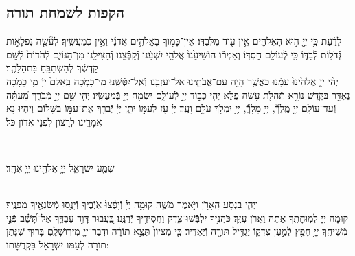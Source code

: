 \documentclass[twoside, openany, parskip=half, 11pt]{book}
\begin{document}
\begin{sometimes}
\chapter[הקפות לשמחת תורה]{ הקפות לשמחת תורה }


 לָדַ֔עַת כִּ֥י יְיָ֖ ה֣וּא הָאֱלֹהִ֑ים אֵ֥ין ע֖וֹד מִלְּֿֿבַדּֽוֹ׃ \hfill \break
אֵין־כָּמ֖וֹךָ בָאֱלֹהִ֥ים אֲדֹנָ֗י וְֿאֵ֣ין כְּֽֿמַעֲשֶֽׂיךָ׃ \hfill \break
לְעֹ֘שֵׂ֤ה נִפְלָא֣וֹת גְּֿדֹל֣וֹת לְֿבַדּ֑וֹ כִּ֖י לְֿעוֹלָ֣ם חַסְדּֽוֹ׃ \hfill \break
וְאִמְר֕וּ הוֹשִׁיעֵ֙נוּ֙ אֱלֹהֵ֣י יִשְׁעֵ֔נוּ וְֿקַבְּֿֿצֵ֥נוּ וְֿהַצִּילֵ֖נוּ מִן־הַגּוֹיִ֑ם לְֿהֹדוֹת֙ לְֿשֵׁ֣ם קָדְֿשֶׁ֔ךָ לְֿהִשְׁתַּבֵּ֖חַ בִּתְהִלָּתֶֽךָ׃\\
יְהִ֨י יְיָ֤ אֱלֹהֵ֙ינוּ֙ עִמָּ֔נוּ כַּאֲשֶׁ֥ר הָיָ֖ה עִם־אֲבֹתֵ֑ינוּ אַל־יַעַזְבֵ֖נוּ וְֿאַֽל־יִטְּֿשֵֽׁנוּ׃ \hfill \break
מִֽי־כָמֹ֤כָה בָּֽאֵלִם֙ יְיָ֔ מִ֥י כָּמֹ֖כָה נֶאְדָּ֣ר בַּקֹּ֑דֶשׁ נוֹרָ֥א תְֿהִלֹּ֖ת עֹ֥שֵׂה פֶֽלֶא׃ \hfill \break
יְהִ֤י כְב֣וֹד יְיָ֣ לְֿעוֹלָ֑ם יִשְׂמַ֖ח יְיָ֣ בְּֿמַעֲשָֽׂיו׃ \hfill \break
יְהִ֤י שֵׁ֣ם יְיָ֣ מְֿבֹרָ֑ךְ מֵ֝עַתָּ֗ה וְֿעַד־עוֹלָֽם׃ \hfill \break
יְיָ֣ מֶֽלֶךְ֘, יְיָ֣ מָלָךְֿ֘, יְיָ֥ יִמְלֹ֖ךְ עֹלָ֥ם וָעֶֽד׃ \hfill \break
יְיָ֗ עֹ֖ז לְעַמּ֣וֹ יִתֵּ֑ן יְיָ֓ יְֿבָרֵ֖ךְ אֶת־עַמּ֣וֹ בַשָּׁלֽוֹם׃ \hfill \break
וְיִהְיוּ נָא אֲמָרֵֽינוּ לְֿרָצוֹן לִפְנֵי אֲדוֹן כֹּל׃ \hfill \break

\vspace{-1.3\baselineskip}

\\
\begin{large}
שְׁמַ֖ע יִשְׂרָאֵ֑ל יְיָ֥ אֱלֹהֵ֖ינוּ יְיָ֥ אֶחָֽד׃
\end{large}

\\
וַיְהִ֛י בִּנְסֹ֥עַ הָֽאָרֹ֖ן וַיֹּ֣אמֶר מֹשֶׁ֑ה קוּמָ֣ה יְיָ֗ וְֿיָפֻ֨צוּ֙ אֹֽיְֿבֶ֔יךָ וְֿיָנֻ֥סוּ מְֿשַׂנְאֶ֖יךָ מִפָּנֶֽיךָ׃\\
קוּמָה יְיָ לִמְוּחָתֶֽךָ אַתָה וַאֲרֹן עֻזֶּֽךָ׃ \hfill \break
כֹּהֲנֶ֥יךָ יִלְבְּֿֿשׁוּ־צֶ֑דֶק וַחֲסִידֶ֥יךָ יְֿרַנֵּֽנוּ׃ \hfill \break
 בַּֽ֭עֲבוּר דָּוִ֣ד עַבְדֶּ֑ךָ אַל־תָּ֝שֵׁ֗ב פְּֿנֵ֣י מְֿשִׁיחֶֽךָ׃ \hfill \break
יְיָ֥ חָפֵ֖ץ לְֿמַ֣עַן צִדְק֑וֹ יַגְדִּ֥יל תּוֹרָ֖ה וְֿיַאְדִּֽיר׃ \hfill \break
כִּ֤י מִצִּיּוֹן֙ תֵּצֵ֣א תוֹרָ֔ה וּדְבַר־יְיָ֖ מִירֽוּשָׁלָֽםִ׃ \hfill \break
 בָּרוּךְ שֶׁנָּתַן תּוֹרָה לְֿעַמּוֹ יִשְׂרָאֵל בִּקְדֻשָּׁתוֹ: \hfill \break


\end{sometimes}
\end{document}
